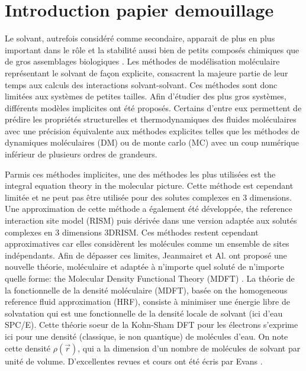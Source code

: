 \section{Introduction papier demouillage}
Le solvant, autrefois considéré comme secondaire, apparait de plus en plus important dans le rôle et la stabilité aussi bien de petits composés chimiques\cite{khamar_investigating_2014} que de gros assemblages biologiques \cite{prabhu_proteinsolvent_2006, kuhrova_are_2014, schwabe_role_1997}. Les méthodes de modélisation moléculaire représentant le solvant de façon explicite, consacrent la majeure partie de leur temps aux calculs des interactions solvant-solvant. Ces méthodes sont donc limitées aux systèmes de petites tailles. Afin d'étudier des plus gros systèmes, différents modèles implicites\cite{roux_implicit_1999} ont été proposés. Certains d'entre eux permettent de prédire les propriétés structurelles et thermodynamiques des fluides moléculaires avec une précision équivalente aux méthodes explicites telles que les méthodes de dynamiques moléculaires (DM) ou de monte carlo (MC) avec un coup numérique inférieur de plusieurs ordres de grandeurs.



Parmis ces méthodes implicites, une des méthodes les plus utilisées est the integral equation theory in the molecular picture\cite{blum_invariant_1972,blum_invariant_1972-1}. Cette méthode est cependant limitée et ne peut pas être utilisée pour des solutes complexes en 3 dimensions. Une approximation de cette méthode a également été développée, the reference interaction site model (RISM)\cite{chandler_optimized_1972,hirata_application_1982} puis dérivée dans une version adaptée aux solutés complexes en 3 dimensions 3DRISM\cite{beglov_integral_1997,hirata_molecular_2003}. Ces méthodes restent cependant approximatives car elles considèrent les molécules comme un ensemble de sites indépendants. Afin de dépasser ces limites, Jeanmairet et Al. ont proposé une nouvelle théorie, moléculaire et adaptée à n'importe quel soluté de n'importe quelle forme: the Molecular Density Functional Theory (MDFT) \cite{ramirez_density_2002, ramirez_direct_2005, ramirez_density_2005, gendre_classical_2009, zhao_molecular_2011, borgis_molecular_2012, levesque_scalar_2012, levesque_solvation_2012, jeanmairet_molecular_2013-1}. La théorie de la fonctionnelle de la densité moléculaire (MDFT), basée on the homogeneous reference fluid approximation (HRF), consiste à minimiser une énergie libre de solvatation qui est une fonctionnelle de la densité locale de solvant (ici d'eau SPC/E)\cite{berendsen_missing_1987}. Cette théorie soeur de la Kohn-Sham DFT \cite{kohn_self-consistent_1965} pour les électrons s'exprime ici pour une densité (classique, ie non quantique) de molécules d'eau. On note cette densité  $\rho(\vec{r})$, qui a la dimension d'un nombre de molécules de solvant par unité de volume. D'excellentes revues et cours ont été écris par Evans \cite{evans_nature_1979,evans_density_2009,henderson_fundamentals_1992}.

